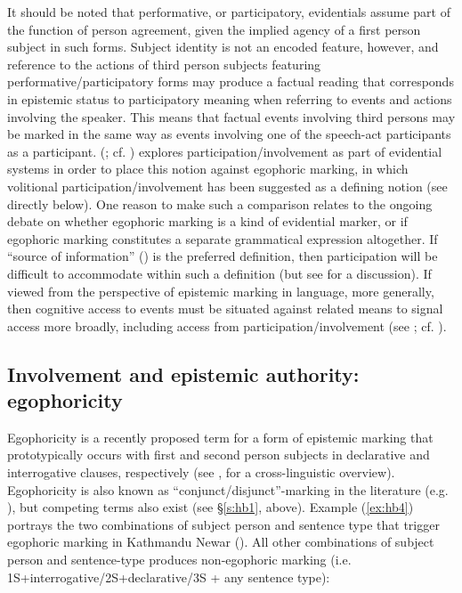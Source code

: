 \documentclass[output=paper]{langsci/langscibook}
\begin{document}
It should be noted that performative, or participatory, evidentials assume part of the function of person agreement, given the implied agency of a first person subject in such forms. Subject identity is not an encoded feature, however, and reference to the actions of third person subjects featuring performative/participatory forms may produce a factual reading that corresponds in epistemic status to participatory meaning when referring to events and actions involving the speaker. This means that factual events involving third persons may be marked in the same way as events involving one of the speech-act participants as a participant. \citeauthor{BergqvistKittila2017} (\citeyear{BergqvistKittila2017}; cf. \citealt{Bergqvist2015}) explores participation/involvement as part of evidential systems in order to place this notion against egophoric marking, in which volitional participation/involvement has been suggested as a defining notion (see directly below). One reason to make such a comparison relates to the ongoing debate on whether egophoric marking is a kind of evidential marker, or if egophoric marking constitutes a separate grammatical expression altogether. If “source of information” (\citealt{Aikhenvald2004}) is the preferred definition, then participation will be difficult to accommodate within such a definition (but see \citealt{SanRoqueLoughnane2012} for a discussion). If viewed from the perspective of epistemic marking in language, more generally, then cognitive access to events must be situated against related means to signal access more broadly, including access from participation/involvement (see \citealt{Bergqvist2017}; cf. \citealt{Boye2012}).  
%
\subsection{Involvement and epistemic authority: egophoricity}\label{s:hb3-2}

Egophoricity is a recently proposed term for a form of epistemic marking that prototypically occurs with first and second person subjects in declarative and interrogative clauses, respectively (see \citealt{SanRoqueetal2018}, for a cross-linguistic overview). Egophoricity is also known as “conjunct/disjunct”-marking in the literature (e.g. \citealt{BickelNichols2007}), but competing terms also exist (see §\ref{s:hb1}, above). Example (\ref{ex:hb4}) portrays the two combinations of subject person and sentence type that trigger egophoric marking in Kathmandu Newar (\citealt{Hale1980}). All other combinations of subject person and sentence-type produces non-egophoric marking (i.e. 1S+interrogative/2S+declarative/3S + any sentence type):
\end{document}
